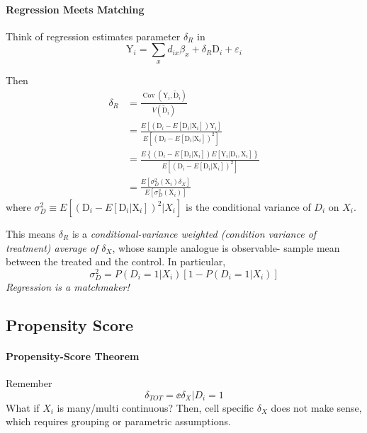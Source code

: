 \documentclass[11pt]{article}
\begin{document}
\paragraph*{Regression Meets Matching}

Think of regression estimates parameter $\delta_R$ in
$$
\mathrm{Y}_{i}=\sum_{x} d_{i x} \beta_{x}+\delta_{R} \mathrm{D}_{i}+\varepsilon_{i}
$$

Then
\begin{align*}
    \delta_{R} 
    &=\frac{\operatorname{Cov}\left(\mathrm{Y}_{i}, \tilde{\mathrm{D}}_{i}\right)}{V\left(\tilde{\mathrm{D}}_{i}\right)}\\
    &=\frac{E\left[\left(\mathrm{D}_{i}-E\left[\mathrm{D}_{i} | \mathrm{X}_{i}\right]\right) \mathrm{Y}_{i}\right]}{E\left[\left(\mathrm{D}_{i}-E\left[\mathrm{D}_{i} | \mathrm{X}_{i}\right]\right)^{2}\right]} \\ 
    &=\frac{E\left\{\left(\mathrm{D}_{i}-E\left[\mathrm{D}_{i} | \mathrm{X}_{i}\right]\right) E\left[\mathrm{Y}_{i} | \mathrm{D}_{i}, \mathrm{X}_{i}\right]\right\}}{E\left[\left(\mathrm{D}_{i}-E\left[\mathrm{D}_{i} | \mathrm{X}_{i}\right]\right)^{2}\right]}\\
    &=\frac{E\left[\sigma_{D}^{2}\left(\mathrm{X}_{i}\right) \delta_{X}\right]}{E\left[\sigma_{D}^{2}\left(\mathrm{X}_{i}\right)\right]}
\end{align*}
where $\sigma_{D}^{2}\equiv E\left[\left(\mathrm{D}_{i}-E\left[\mathrm{D}_{i} | \mathrm{X}_{i}\right]\right)^{2}|X_i\right]$ is the conditional variance of $D_i$ on $X_i$.
\begin{interpretation}
This means $\delta_{R}$ is a \emph{conditional-variance weighted (condition variance of treatment) average of $\delta_X$}, whose sample analogue is observable- sample mean between the treated and the control. In particular, 
$$
\sigma_{D}^{2}=P(D_i=1|X_i)[1-P(D_i=1|X_i)]
$$
\emph{Regression is a matchmaker!}
\end{interpretation}


\subsection{Propensity Score}
\paragraph*{Propensity-Score Theorem}
Remember
\begin{equation}
    \delta_{TOT}=\ee{\delta_X|D_i=1}
\end{equation}
What if $X_i$ is many/multi continuous? Then, cell specific $\delta_X$ does not make sense, which requires grouping or parametric assumptions.
\end{document}
